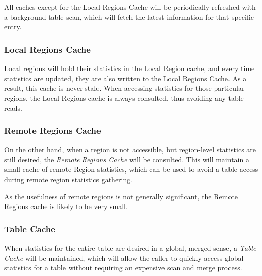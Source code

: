 All caches except for the Local Regions Cache will be periodically refreshed with a background table scan, which will fetch the latest information for that specific entry. 

\subsubsection{Local Regions Cache}
Local regions will hold their statistics in the Local Region cache, and every time statistics are updated, they are also written to the Local Regions Cache. As a result, this cache is never stale. When accessing statistics for those particular regions, the Local Regions cache is always consulted, thus avoiding any table reads.

\subsubsection{Remote Regions Cache}
On the other hand, when a region is not accessible, but region-level statistics are still desired, the \emph{Remote Regions Cache} will be consulted. This will maintain a small cache of remote Region statistics, which can be used to avoid a table access during remote region statistics gathering.

As the usefulness of remote regions is not generally significant, the Remote Regions cache is likely to be very small.

\subsubsection{Table Cache}
When statistics for the entire table are desired in a global, merged sense, a \emph{Table Cache} will be maintained, which will allow the caller to quickly access global statistics for a table without requiring an expensive scan and merge process.
